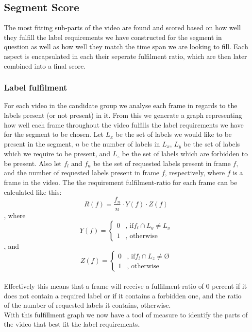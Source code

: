 \subsection{Segment Score}\label{sec:segment_score}
%

The most fitting sub-parts of the video are found and scored based on how well they fulfill the label requirements we have constructed for the segment in question as well as how well they match the time span we are looking to fill. Each aspect is encapsulated in each their seperate fulfilment ratio, which are then later combined into a final score.\\

\subsubsection{Label fulfilment}
%
For each video in the candidate group we analyse each frame in regards to the labels present (or not present) in it. From this we generate a graph representing how well each frame throughout the video fulfills the label requirements we have for the segment to be chosen. Let $L_{x}$ be the set of labels we would like to be present in the segment, $n$ be the number of labels in $L_{x}$, $L_{y}$ be the set of labels which we require to be present, and $L_{z}$ be the set of labels which are forbidden to be present. Also let $f_{l}$ and $f_{n}$ be the set of requested labels present in frame $f$, and the number of requested labels present in frame $f$, respectively, where $f$ is a frame in the video. The the requirement fulfilment-ratio for each frame can be calculated like this:\\
%
\begin{equation}
R(f) = \frac{f_{n}}{n} \cdot Y(f) \cdot Z(f)
\end{equation} 
%
, where\\
%
\begin{equation}
Y(f) =
\begin{cases}
0 & \text{, if} f_{l} \cap L_{y} \neq L_{y}\\
1 &  \text{, otherwise}
\end{cases}
\end{equation} 
%
, and\\
%
\begin{equation}
Z(f) =
\begin{cases}
0 & \text{, if} f_{l} \cap L_{z} \neq Ø\\
1 &  \text{, otherwise}
\end{cases}
\end{equation} 
%
\\
%
Effectively this means that a frame will receive a fulfilment-ratio of 0 percent if it does not contain a required label or if it contains a forbidden one, and the ratio of the number of requested labels it contains, otherwise.\\
%
With this fulfillment graph we now have a tool of measure to identify the parts of the video that best fit the label requirements.
%
